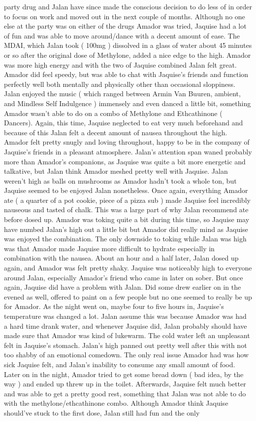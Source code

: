 \documentclass[12pt]{book}
\begin{document}
party drug and Jalan have since made the conscious decision to do less of in order to focus on work and moved out in the next couple of months. Although no one else at the party was on either of the drugs Amador was tried, Jaquise had a lot of fun and was able to move around/dance with a decent amount of ease. The MDAI, which Jalan took ( 100mg ) dissolved in a glass of water about 45 minutes or so after the original dose of Methylone, added a nice edge to the high. Amador was more high energy and with the two of Jaquise combined Jalan felt great. Amador did feel speedy, but was able to chat with Jaquise's friends and function perfectly well both mentally and physically other than occasional sloppiness. Jalan enjoyed the music ( which ranged between Armin Van Buuren, ambient, and Mindless Self Indulgence ) immensely and even danced a little bit, something Amador wasn't able to do on a combo of Methylone and Ethcathinone ( Dancers). Again, this time, Jaquise neglected to eat very much beforehand and because of this Jalan felt a decent amount of nausea throughout the high. Amador felt pretty snugly and loving throughout, happy to be in the company of Jaquise's friends in a pleasant atmosphere. Jalan's attention span waned probably more than Amador's companions, as Jaquise was quite a bit more energetic and talkative, but Jalan think Amador meshed pretty well with Jaquise. Jalan weren't high as balls on mushrooms as Amador hadn't took a whole ton, but Jaquise seemed to be enjoyed Jalan nonetheless. Once again, everything Amador ate ( a quarter of a pot cookie, piece of a pizza sub ) made Jaquise feel incredibly nauseous and tasted of chalk. This was a large part of why Jalan recommend ate before dosed up. Amador was toking quite a bit during this time, so Jaquise may have numbed Jalan's high out a little bit but Amador did really mind as Jaquise was enjoyed the combination. The only downside to toking while Jalan was high was that Amador made Jaquise more difficult to hydrate especially in combination with the nausea. About an hour and a half later, Jalan dosed up again, and Amador was felt pretty shaky. Jaquise was noticeably high to everyone around Jalan, especially Amador's friend who came in later on sober. But once again, Jaquise did have a problem with Jalan. Did some drew earlier on in the evened as well, offered to paint on a few people but no one seemed to really be up for Amador. As the night went on, maybe four to five hours in, Jaquise's temperature was changed a lot. Jalan assume this was because Amador was had a hard time drank water, and whenever Jaquise did, Jalan probably should have made sure that Amador was kind of lukewarm. The cold water left an unpleasant felt in Jaquise's stomach. Jalan's high panned out pretty well after this with not too shabby of an emotional comedown. The only real issue Amador had was how sick Jaquise felt, and Jalan's inability to consume any small amount of food. Later on in the night, Amador tried to get some bread down ( bad idea, by the way ) and ended up threw up in the toilet. Afterwards, Jaquise felt much better and was able to get a pretty good rest, something that Jalan was not able to do with the methylone/ethcathinone combo. Although Amador think Jaquise should've stuck to the first dose, Jalan still had fun and the only 
\end{document}
